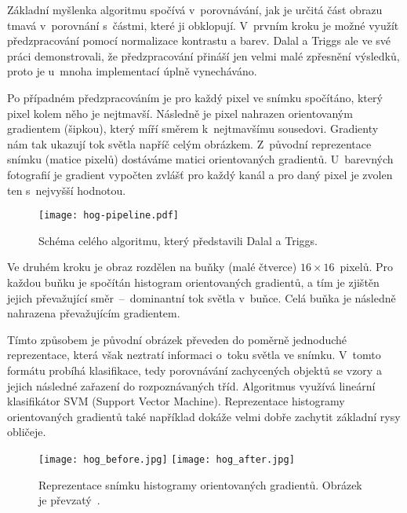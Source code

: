 Základní myšlenka algoritmu spočívá v~porovnávání, jak je určitá část obrazu tmavá v~porovnání s~částmi, které ji obklopují. V~prvním kroku je možné využít předzpracování pomocí normalizace kontrastu a barev. Dalal a Triggs ale ve své práci demonstrovali, že předzpracování přináší jen velmi malé zpřesnění výsledků, proto je u~mnoha implementací úplně vynecháváno.

Po případném předzpracováním je pro každý pixel ve snímku spočítáno, který pixel kolem něho je nejtmavší. Následně je pixel nahrazen orientovaným gradientem (šipkou), který míří směrem k~nejtmavšímu sousedovi. Gradienty nám tak ukazují tok světla napříč celým obrázkem. Z~původní reprezentace snímku (matice pixelů) dostáváme matici orientovaných gradientů. U~barevných fotografií je gradient vypočten zvlášť pro každý kanál a pro daný pixel je zvolen ten s~nejvyšší hodnotou.

\begin{figure}[H]
    \centering
    \texttt{[image: hog-pipeline.pdf]}
    \caption[Schéma algoritmu HOG]{Schéma celého algoritmu, který představili Dalal a Triggs.}
    \label{fig_hog}
\end{figure}

Ve druhém kroku je obraz rozdělen na buňky (malé čtverce) $16\times16$~pixelů. Pro každou buňku je spočítán histogram orientovaných gradientů, a tím je zjištěn jejich převažující směr~--~dominantní tok světla v~buňce. Celá buňka je následně nahrazena převažujícím gradientem.

Tímto způsobem je původní obrázek převeden do poměrně jednoduché reprezentace, která však neztratí informaci o~toku světla ve snímku. V~tomto formátu probíhá klasifikace, tedy porovnávání zachycených objektů se vzory a jejich následné zařazení do rozpoznávaných tříd. Algoritmus využívá lineární klasifikátor SVM (Support Vector Machine). Reprezentace histogramy orientovaných gradientů také například dokáže velmi dobře zachytit základní rysy obličeje.

\begin{figure}[H]
    \centering
    \texttt{[image: hog\_before.jpg]}
    \texttt{[image: hog\_after.jpg]}
    \caption[Reprezentace snímku histogramy orientovaných gradientů]{Reprezentace snímku histogramy orientovaných gradientů. Obrázek je převzatý~\cite{docsScikitHog}.}
    \label{fig_hog}
\end{figure}

